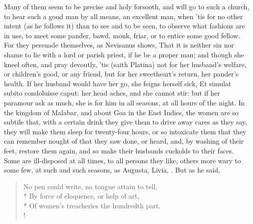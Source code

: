 Many of them seem to be precise and holy forsooth, and will go to such
a church, to hear such a good man by all means, an excellent man,
when 'tis for no other intent (as he follows it) than to see and to be
seen, to observe what fashions are in use, to meet some pander, bawd,
monk, friar, or to entice some good fellow. For they persuade
themselves, as  Nevisanus shows, That it is neither sin nor shame
to lie with a lord or parish priest, if he be a proper man; and
though she kneel often, and pray devoutly, 'tis (saith Platina) not for
her husband's welfare, or children's good, or any friend, but for her
sweetheart's return, her pander's health. If her husband would have her
go, she feigns herself sick, Et simulat subito condoluisse caput:
her head aches, and she cannot stir: but if her paramour ask as much,
she is for him in all seasons, at all hours of the night. In the
kingdom of Malabar, and about Goa in the East Indies, the women are so
subtile that, with a certain drink they give them to drive away cares
as they say, they will make them sleep for twenty-four hours, or
so intoxicate them that they can remember nought of that they saw done,
or heard, and, by washing of their feet, restore them again, and so
make their husbands cuckolds to their faces. Some are ill-disposed at
all times, to all persons they like, others more wary to some few, at
such and such seasons, as Augusta, Livia, . But as he said,
%
\begin{verse}%
No pen could write, no tongue attain to tell,\\*
By force of eloquence, or help of art,\\*
Of women's treacheries the hundredth part.\\!
\end{verse}%

